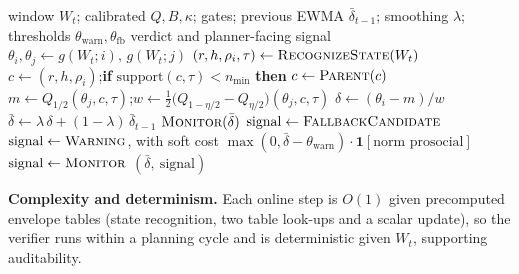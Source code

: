 \begin{algorithm}[t]
\caption{Online social-compliance verification step at time $t$}
\label{alg:online}
\begin{algorithmic}[1]
\REQUIRE window $W_t$; calibrated $Q,B,\kappa$; gates; previous EWMA $\bar\delta_{t-1}$;
         smoothing $\lambda$; thresholds $\theta_{\mathrm{warn}},\theta_{\mathrm{fb}}$
\ENSURE verdict and planner-facing signal
\STATE $\theta_i,\theta_j\leftarrow g(W_t;i),\,g(W_t;j)$ 
\STATE $(r,h,\rho_i,\tau)\leftarrow \textsc{RecognizeState}(W_t)$
\STATE $c\leftarrow(r,h,\rho_i)$;\quad \textbf{if} $\mathrm{support}(c,\tau)<n_{\min}$ \textbf{then} $c\leftarrow\textsc{Parent}(c)$
\STATE $m\leftarrow Q_{1/2}(\theta_j,c,\tau)$;\quad $w\leftarrow\tfrac12\bigl(Q_{1-\eta/2}-Q_{\eta/2}\bigr)(\theta_j,c,\tau)$
\STATE $\delta\leftarrow (\theta_i-m)/w$ 
\STATE $\bar\delta\leftarrow \lambda\,\delta+(1-\lambda)\,\bar\delta_{t-1}$ 
    \RETURN $\textsc{Monitor}(\bar\delta)$ 
\ENDIF
{}
    \STATE $\text{signal}\leftarrow\textsc{FallbackCandidate}$
    \STATE $\text{signal}\leftarrow\textsc{Warning}$, with soft cost $\max(0,\bar\delta-\theta_{\mathrm{warn}})\cdot\mathbf{1}[\text{norm prosocial}]$
\ELSE
    \STATE $\text{signal}\leftarrow\textsc{Monitor}$
\ENDIF
\RETURN $(\bar\delta,\ \text{signal})$
\end{algorithmic}
\end{algorithm}

\noindent\textbf{Complexity and determinism.} Each online step is $O(1)$ given precomputed
envelope tables (state recognition, two table look-ups and a scalar update), so the verifier
runs within a planning cycle and is deterministic given $W_t$, supporting auditability.
